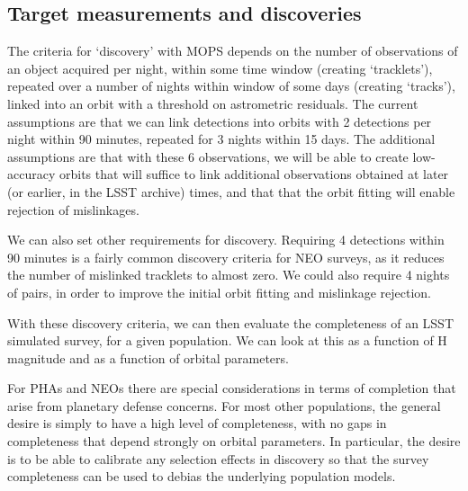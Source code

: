 
\subsection{Target measurements and discoveries}
\label{sec:\secname:targets}

The criteria for `discovery' with MOPS depends on the number
of observations of an object acquired per night, within some time
window (creating `tracklets'), repeated over a number of nights within window of some
days (creating `tracks'), linked into an orbit with a threshold on
astrometric residuals. The current assumptions are that we can link
detections into orbits with 2 detections per night within 90 minutes,
repeated for 3 nights within 15 days. The additional assumptions are
that with these 6 observations, we will be able to create low-accuracy orbits that will suffice to link
additional observations obtained at later (or earlier, in the LSST
archive) times, and that that the orbit fitting will enable rejection
of mislinkages.

We can also set other requirements for discovery. Requiring 4
detections within 90 minutes is a fairly common discovery criteria for
NEO surveys, as it reduces the number of mislinked tracklets to almost
zero. We could also require 4 nights of pairs, in order to improve the
initial orbit fitting and mislinkage rejection.

With these discovery criteria, we can then evaluate the completeness
of an LSST simulated survey, for a given population. We can look at
this as a function of H magnitude and as a function of orbital
parameters.

For PHAs and NEOs there are special considerations in terms of
completion that arise from planetary defense concerns. For most other
populations, the general desire is simply to have a high level of
completeness, with no gaps in completeness that depend strongly on
orbital parameters. In particular, the desire is to be able to
calibrate any selection effects in discovery so that the survey completeness can
be used to debias the underlying population models.

